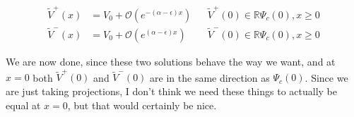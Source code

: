 \documentclass[12pt]{article}
\def\R{{\mathbb R}}
\begin{document}
\begin{align*}
\tilde{V}^+(x) &= V_0 + \mathcal{O}(e^{-(\alpha - \epsilon)x}) && \tilde{V}^+(0) \in \R \Psi_c(0), x \geq 0 \\
\tilde{V}^-(x) &= V_0 + \mathcal{O}(e^{(\alpha - \epsilon)x}) && \tilde{V}^-(0) \in \R \Psi_c(0), x \geq 0
\end{align*}

We are now done, since these two solutions behave the way we want, and at $x = 0$ both $\tilde{V}^+(0)$ and $\tilde{V}^-(0)$ are in the same direction as $\Psi_c(0)$. Since we are just taking projections, I don't think we need these things to actually be equal at $x = 0$, but that would certainly be nice.
\end{document}
